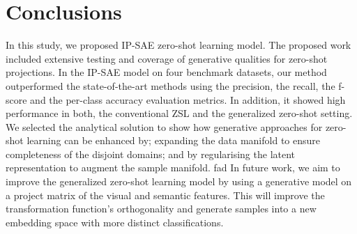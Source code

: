 \documentclass{article}
\begin{document}
\section{Conclusions}
\label{conc}
In this study, we proposed IP-SAE zero-shot learning model. The proposed work included extensive testing and coverage of generative qualities for zero-shot projections. In the IP-SAE model on four benchmark datasets, our method outperformed the state-of-the-art methods using the precision, the recall, the f-score and the per-class accuracy evaluation metrics. In addition, it showed high performance in both, the conventional ZSL and the generalized zero-shot setting. We selected the analytical solution to show how generative approaches for zero-shot learning can be enhanced by; expanding the data manifold to ensure completeness of the disjoint domains; and by regularising the latent representation to augment the sample manifold.
fad
In future work, we aim to improve the generalized zero-shot learning model by using a generative model on a project matrix of the visual and semantic features. This will improve the transformation function's orthogonality and generate samples into a new embedding space with more distinct classifications.


%  
%  
\end{document}
